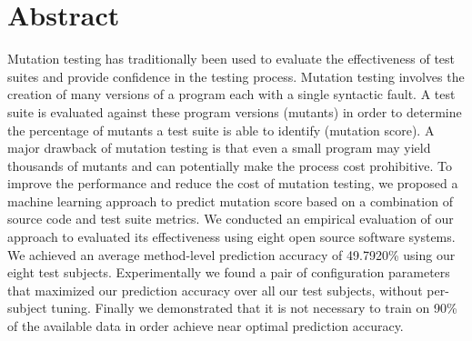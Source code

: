 \chapter*{Abstract}
Mutation testing has traditionally been used to evaluate the effectiveness of test suites and provide confidence in the testing process. Mutation testing involves the creation of many versions of a program each with a single syntactic fault. A test suite is evaluated against these program versions (mutants) in order to determine the percentage of mutants a test suite is able to identify (mutation score). A major drawback of mutation testing is that even a small program may yield thousands of mutants and can potentially make the process cost prohibitive. To improve the performance and reduce the cost of mutation testing, we proposed a machine learning approach to predict mutation score based on a combination of source code and test suite metrics. We conducted an empirical evaluation of our approach to evaluated its effectiveness using eight open source software systems. We achieved an average method-level prediction accuracy of 49.7920\% using our eight test subjects. Experimentally we found a pair of configuration parameters that maximized our prediction accuracy over all our test subjects, without per-subject tuning. Finally we demonstrated that it is not necessary to train on 90\% of the available data in order achieve near optimal prediction accuracy.
